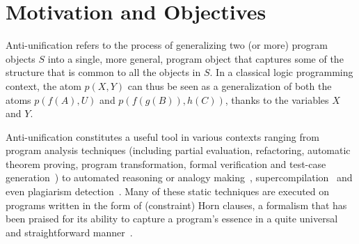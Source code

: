 \section{Motivation and Objectives}

Anti-unification refers to the process of generalizing two (or more) program objects $S$ into a single, more general, program object that captures some of the structure that is common to all the objects in $S$. In a classical logic programming context, the atom $p(X,Y)$ can thus be seen as a generalization of both the atoms $p(f(A), U)$ and $p(f(g(B)),h(C))$, thanks to the variables $X$ and $Y$. 

Anti-unification constitutes a useful tool in various contexts ranging from program analysis techniques (including partial evaluation, refactoring, automatic theorem proving, program transformation, formal verification and test-case generation~\cite{au-applications,calculus-constr,DESCHREYE1999231,lg-gs,under-implication}) to automated reasoning \cite{ilp-theory-and-methods,Muggleton90efficientinduction} or analogy making~\cite{analogy-making}, supercompilation~\cite{Sorensen95analgorithm} and even plagiarism detection~\cite{clones}. Many of these static techniques are executed on programs written in the form of (constraint) Horn clauses, a formalism that has been praised for its ability to capture a program's essence in a quite universal and straightforward manner~\cite{horn-clauses-intermediate-representation}. 

